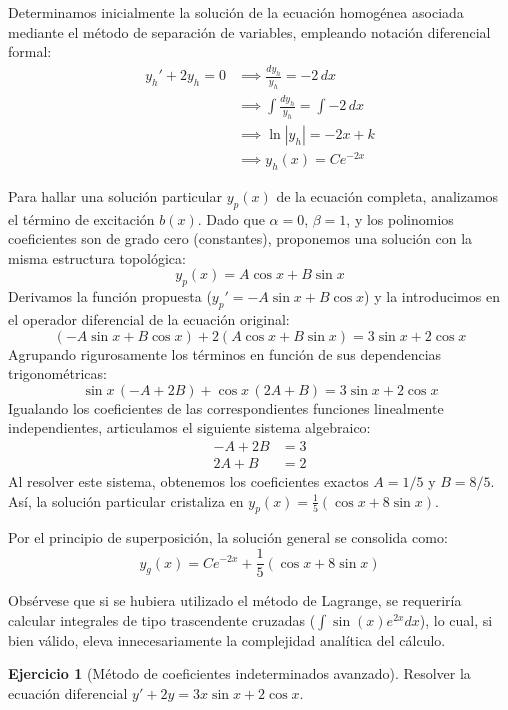 \documentclass[11pt,a4paper]{article}
\theoremstyle{definition}
\newtheorem{exercise}{Ejercicio}[section]
\theoremstyle{plain}
\begin{document}
\begin{tcolorbox}
Determinamos inicialmente la solución de la ecuación homogénea asociada mediante el método de separación de variables, empleando notación diferencial formal:
\begin{align*}
    y_h' + 2y_h = 0 &\implies \frac{dy_h}{y_h} = -2\,dx \\
    &\implies \int \frac{dy_h}{y_h} = \int -2\,dx \\
    &\implies \ln|y_h| = -2x + k \\
    &\implies y_h(x) = C e^{-2x}
\end{align*}

Para hallar una solución particular $y_p(x)$ de la ecuación completa, analizamos el término de excitación $b(x)$. Dado que $\alpha = 0$, $\beta = 1$, y los polinomios coeficientes son de grado cero (constantes), proponemos una solución con la misma estructura topológica:
$$ y_p(x) = A\cos x + B\sin x $$
Derivamos la función propuesta ($y_p' = -A\sin x + B\cos x$) y la introducimos en el operador diferencial de la ecuación original:
$$ (-A\sin x + B\cos x) + 2(A\cos x + B\sin x) = 3\sin x + 2\cos x $$
Agrupando rigurosamente los términos en función de sus dependencias trigonométricas:
$$ \sin x \, (-A + 2B) + \cos x \, (2A + B) = 3\sin x + 2\cos x $$
Igualando los coeficientes de las correspondientes funciones linealmente independientes, articulamos el siguiente sistema algebraico:
\begin{align*}
    -A + 2B &= 3 \\
     2A + B &= 2 
\end{align*}
Al resolver este sistema, obtenemos los coeficientes exactos $A = 1/5$ y $B = 8/5$. Así, la solución particular cristaliza en $y_p(x) = \frac{1}{5}(\cos x + 8\sin x)$.

Por el principio de superposición, la solución general se consolida como:
$$ y_g(x) = C e^{-2x} + \frac{1}{5}(\cos x + 8\sin x) $$

Obsérvese que si se hubiera utilizado el método de Lagrange, se requeriría calcular integrales de tipo trascendente cruzadas ($\int \sin(x)e^{2x}dx$), lo cual, si bien válido, eleva innecesariamente la complejidad analítica del cálculo.
\end{tcolorbox}

\begin{exercise}[Método de coeficientes indeterminados avanzado]
Resolver la ecuación diferencial $y' + 2y = 3x \sin x + 2\cos x$.
\end{exercise}
\end{document}

